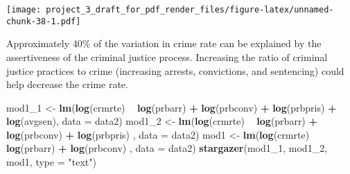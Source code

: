 \documentclass[]{article}
\newenvironment{Shaded}{\begin{snugshade}}{\end{snugshade}}
\newcommand{\DataTypeTok}[1]{\textcolor[rgb]{0.13,0.29,0.53}{#1}}
\newcommand{\DecValTok}[1]{\textcolor[rgb]{0.00,0.00,0.81}{#1}}
\newcommand{\KeywordTok}[1]{\textcolor[rgb]{0.13,0.29,0.53}{\textbf{#1}}}
\newcommand{\NormalTok}[1]{#1}
\newcommand{\OperatorTok}[1]{\textcolor[rgb]{0.81,0.36,0.00}{\textbf{#1}}}
\newcommand{\StringTok}[1]{\textcolor[rgb]{0.31,0.60,0.02}{#1}}
\begin{document}
\texttt{[image: project\_3\_draft\_for\_pdf\_render\_files/figure-latex/unnamed-chunk-38-1.pdf]}

Approximately 40\% of the variation in crime rate can be explained by
the assertiveness of the criminal justice process. Increasing the ratio
of criminal justice practices to crime (increasing arrests, convictions,
and sentencing) could help decrease the crime rate.

\begin{Shaded}
\begin{Highlighting}[]
\NormalTok{mod1_}\DecValTok{1}\NormalTok{ <-}\StringTok{ }\KeywordTok{lm}\NormalTok{(}\KeywordTok{log}\NormalTok{(crmrte) }\OperatorTok{~}\StringTok{ }\KeywordTok{log}\NormalTok{(prbarr) }\OperatorTok{+}\StringTok{ }\KeywordTok{log}\NormalTok{(prbconv) }\OperatorTok{+}\StringTok{ }\KeywordTok{log}\NormalTok{(prbpris) }\OperatorTok{+}\StringTok{ }\KeywordTok{log}\NormalTok{(avgsen), }\DataTypeTok{data =}\NormalTok{ data2)}
\NormalTok{mod1_}\DecValTok{2}\NormalTok{ <-}\StringTok{ }\KeywordTok{lm}\NormalTok{(}\KeywordTok{log}\NormalTok{(crmrte) }\OperatorTok{~}\StringTok{ }\KeywordTok{log}\NormalTok{(prbarr) }\OperatorTok{+}\StringTok{ }\KeywordTok{log}\NormalTok{(prbconv) }\OperatorTok{+}\StringTok{ }\KeywordTok{log}\NormalTok{(prbpris) , }\DataTypeTok{data =}\NormalTok{ data2)}
\NormalTok{mod1 <-}\StringTok{ }\KeywordTok{lm}\NormalTok{(}\KeywordTok{log}\NormalTok{(crmrte) }\OperatorTok{~}\StringTok{ }\KeywordTok{log}\NormalTok{(prbarr) }\OperatorTok{+}\StringTok{ }\KeywordTok{log}\NormalTok{(prbconv) , }\DataTypeTok{data =}\NormalTok{ data2)}
\KeywordTok{stargazer}\NormalTok{(mod1_}\DecValTok{1}\NormalTok{, mod1_}\DecValTok{2}\NormalTok{, mod1, }\DataTypeTok{type =} \StringTok{"text"}\NormalTok{)}
\end{Highlighting}
\end{Shaded}
\end{document}
